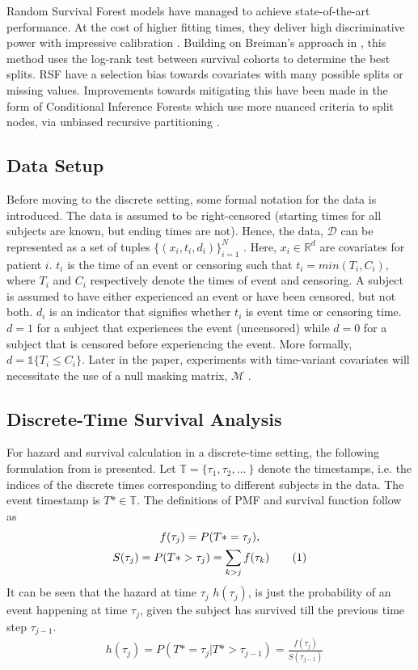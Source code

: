 \documentclass[%
 twocolumn,
 reprint,
 amsmath,amssymb,
 aps,nofootinbib
]{revtex4-2}
\newcommand\numberthis{\addtocounter{equation}{1}\tag{\theequation}} %
\begin{document}
Random Survival Forest models have managed to achieve state-of-the-art performance. At the cost of higher fitting times, they deliver high discriminative power with impressive calibration \cite{rsf}. Building on Breiman's approach in \cite{rf}, this method uses the log-rank test between survival cohorts to determine the best splits. RSF have a selection bias towards covariates with many possible splits or missing values. Improvements towards mitigating this have been made in the form of Conditional Inference Forests which use more nuanced criteria to split nodes, via unbiased recursive partitioning \cite{cit}.

\subsection{\label{setting}Data Setup}
Before moving to the discrete setting, some formal notation for the data is introduced. The data is assumed to be right-censored (starting times for all subjects are known, but ending times are not). Hence, the data, $\mathcal{D}$ can be represented as a set of tuples $\{(x_i , t_i , d_i)\}_{i=1}^{N}$  \cite{nagpal_deep_2021}. Here, $x_i \in \mathbb{R}^d$ are covariates for patient $i$. $t_i$ is the time of an event or censoring such that $t_i = min(T_i, C_i)$, where $T_i$ and $C_i$ respectively denote the times of event and censoring. A subject is assumed to have either experienced an event or have been censored, but not both. $d_i$ is an indicator that signifies whether $t_i$ is event time or censoring time. $d=1$ for a subject that experiences the event (uncensored) while $d=0$ for a subject that is censored before experiencing the event. More formally, $d= \mathds{1}\{T_i \le C_i\}$. Later in the paper, experiments with time-variant covariates will necessitate the use of a null masking matrix, $\mathcal{M}$ \cite{deephit}.\\

\subsection{\label{discrete}Discrete-Time Survival Analysis}
For hazard and survival calculation in a discrete-time setting, the following formulation from \cite{kvamme_continuous_2019} is presented. Let $\mathbb{T} = \{\tau_1, \tau_2, \ldots\ \}$ denote the timestamps, i.e. the indices of the discrete times corresponding to different subjects in the data. The event timestamp is $T*\in\mathbb{T}$. The definitions of PMF and survival function follow as
\begin{gather*}
f(\tau_j) = P(T* = \tau_j),\\
S(\tau_j) = P(T* >\tau_j) = \sum_{k>j}f(\tau_k) \numberthis  \label{eq:surv_pmf}
\end{gather*}
It can be seen that the hazard at time $\tau_j$ $h(\tau_j)$, is just the probability of an event happening at time $\tau_j$, given the subject has survived till the previous time step $\tau_{j-1}$. 
\begin{align}
&h(\tau_j) = P(T* = \tau_j | T* > \tau_{j-1}) = \frac{f(\tau_j)}{S(\tau_{j-1})} \label{eq:haz_cond_proba}
\end{align}
\end{document}
